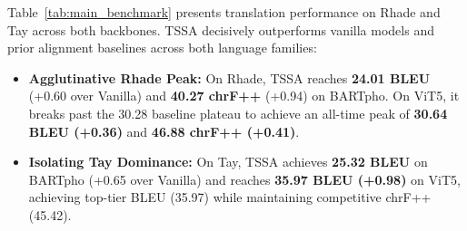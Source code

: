 \documentclass[11pt]{article}
\begin{document}
Table~\ref{tab:main_benchmark} presents translation performance on Rhade and Tay across both backbones. TSSA decisively outperforms vanilla models and prior alignment baselines across both language families:
\begin{itemize}[leftmargin=*]
    \item \textbf{Agglutinative Rhade Peak:} On Rhade, TSSA reaches \textbf{24.01 BLEU} (+0.60 over Vanilla) and \textbf{40.27 chrF++} (+0.94) on BARTpho. On ViT5, it breaks past the 30.28 baseline plateau to achieve an all-time peak of \textbf{30.64 BLEU (+0.36)} and \textbf{46.88 chrF++ (+0.41)}.
    \item \textbf{Isolating Tay Dominance:} On Tay, TSSA achieves \textbf{25.32 BLEU} on BARTpho (+0.65 over Vanilla) and reaches \textbf{35.97 BLEU (+0.98)} on ViT5, achieving top-tier BLEU (35.97) while maintaining competitive chrF++ (45.42).
\end{itemize}
\end{document}
